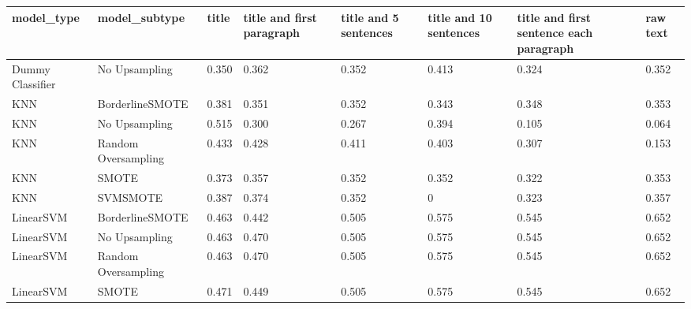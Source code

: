 \begin{tabular}{llllllll}
\toprule
                  model\_type &       model\_subtype & title & title and first paragraph & title and 5 sentences & title and 10 sentences & title and first sentence each paragraph &  raw text \\
\midrule
            Dummy Classifier &       No Upsampling & 0.350 &                     0.362 &                 0.352 &                  0.413 &                                   0.324 &     0.352 \\
                         KNN &     BorderlineSMOTE & 0.381 &                     0.351 &                 0.352 &                  0.343 &                                   0.348 &     0.353 \\
                         KNN &       No Upsampling & 0.515 &                     0.300 &                 0.267 &                  0.394 &                                   0.105 &     0.064 \\
                         KNN & Random Oversampling & 0.433 &                     0.428 &                 0.411 &                  0.403 &                                   0.307 &     0.153 \\
                         KNN &               SMOTE & 0.373 &                     0.357 &                 0.352 &                  0.352 &                                   0.322 &     0.353 \\
                         KNN &            SVMSMOTE & 0.387 &                     0.374 &                 0.352 &                      0 &                                   0.323 &     0.357 \\
                   LinearSVM &     BorderlineSMOTE & 0.463 &                     0.442 &                 0.505 &                  0.575 &                                   0.545 &     0.652 \\
                   LinearSVM &       No Upsampling & 0.463 &                     0.470 &                 0.505 &                  0.575 &                                   0.545 &     0.652 \\
                   LinearSVM & Random Oversampling & 0.463 &                     0.470 &                 0.505 &                  0.575 &                                   0.545 &     0.652 \\
                   LinearSVM &               SMOTE & 0.471 &                     0.449 &                 0.505 &                  0.575 &                                   0.545 &     0.652 \\

\end{tabular}
